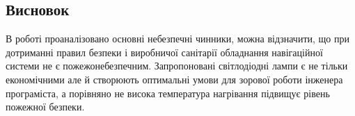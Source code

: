 \subsection{Висновок}
В роботі проаналізовано основні небезпечні чинники, можна відзначити, що при дотриманні правил безпеки і виробничої санітарії обладнання навігаційної системи не є пожежонебезпечним. Запропоновані світлодіодні лампи є не тільки економічними але й створюють оптимальні умови для зорової роботи інженера програміста, а порівняно не висока температура нагрівання підвищує рівень пожежної безпеки.


% 
% 
% 
% 
% 
% 
% 
